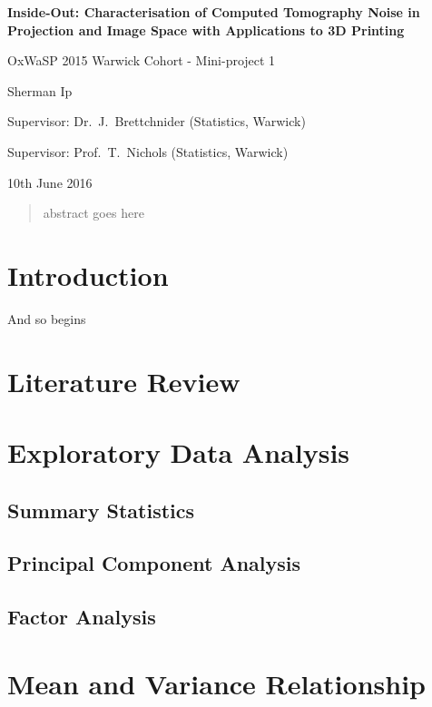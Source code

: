 \documentclass[12pt]{report}
\begin{document}
\begin{titlepage}
\centering
\vspace*{1cm}
        
        \Large
        \textbf{Inside-Out: Characterisation of Computed Tomography Noise in Projection and Image Space with Applications to 3D Printing}
        
		\large        
        
        \vspace{1cm}
        {OxWaSP 2015 Warwick Cohort - Mini-project 1}
        
        \vspace{1cm}
        {Sherman Ip}


        \vspace{1cm}
        {Supervisor: Dr.~J.~Brettchnider (Statistics, Warwick)}
        
        \vspace{1cm}
        {Supervisor: Prof.~T.~Nichols (Statistics, Warwick)}
        
        \vspace{1cm}
        {10th June 2016}
\end{titlepage}

\begin{abstract}
abstract goes here
\end{abstract}

\tableofcontents

\chapter{Introduction}
And so begins
\chapter{Literature Review}
\chapter{Exploratory Data Analysis}
\section{Summary Statistics}
\section{Principal Component Analysis}
\section{Factor Analysis}
\chapter{Mean and Variance Relationship}




\end{document}
